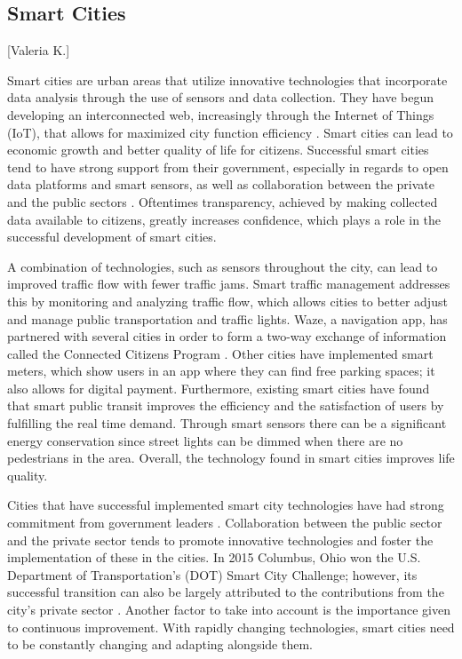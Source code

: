 \documentclass[12pt]{article}                         %
\begin{document}
\subsection{Smart Cities}[Valeria K.]

Smart cities are urban areas that utilize innovative technologies that incorporate data analysis through the use of sensors and data collection. They have begun developing an interconnected web, increasingly through the Internet of Things (IoT), that allows for maximized city function efficiency \cite{MargaretRouseSmartCity}. Smart cities can lead to economic growth and better quality of life for citizens. Successful smart cities tend to have strong support from their government, especially in regards to open data platforms and smart sensors, as well as collaboration between the private and the public sectors \cite{BrianZanghi2017WhyExamples}. Oftentimes transparency, achieved by making collected data available to citizens, greatly increases confidence, which plays a role in the successful development of smart cities.

A combination of technologies, such as sensors throughout the city, can lead to improved traffic flow with fewer traffic jams. Smart traffic management addresses this by  monitoring and analyzing traffic flow, which allows cities to better adjust and manage public transportation and traffic lights. Waze, a navigation app, has partnered with several cities in order to form a two-way exchange of information called the Connected Citizens Program \cite{Stern2016WazeMobility}. Other cities have implemented smart meters, which show users in an app where they can find free parking spaces; it also allows for digital payment. Furthermore, existing smart cities have found that smart public transit improves the efficiency and the satisfaction of users by fulfilling the real time demand. Through smart sensors there can be a significant energy conservation since street lights can be dimmed when there are no pedestrians in the area. Overall, the technology found in smart cities improves life quality.

Cities that have successful implemented smart city technologies have had strong commitment from government leaders \cite{BrianZanghi2017WhyExamples}. Collaboration between the public sector and the private sector tends to promote innovative technologies and foster the implementation of these in the cities. In 2015 Columbus, Ohio won the U.S. Department of Transportation’s (DOT) Smart City Challenge; however, its successful transition can also be largely attributed to the contributions from the city's private sector \cite{FERAN2017SiliconOhio}. Another factor to take into account is the importance given to continuous improvement. With rapidly changing technologies, smart cities need to be constantly changing and adapting alongside them.
\end{document}

